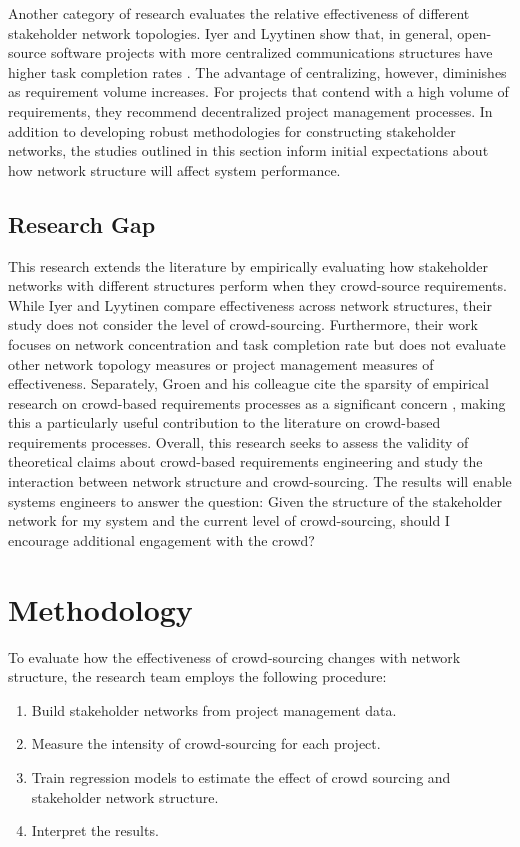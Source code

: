 Another category of research evaluates the relative effectiveness of different stakeholder network topologies. Iyer and Lyytinen show that, in general, open-source software projects with more centralized communications structures have higher task completion rates \cite{iyer}. The advantage of centralizing, however, diminishes as requirement volume increases. For projects that contend with a high volume of requirements, they recommend decentralized project management processes. In addition to developing robust methodologies for constructing stakeholder networks, the studies outlined in this section inform initial expectations about how network structure will affect system performance.

\subsection{Research Gap}

This research extends the literature by empirically evaluating how stakeholder networks with different structures perform when they crowd-source requirements. While Iyer and Lyytinen compare effectiveness across network structures, their study does not consider the level of crowd-sourcing. Furthermore, their work focuses on network concentration and task completion rate but does not evaluate other network topology measures or project management measures of effectiveness. Separately, Groen and his colleague cite the sparsity of empirical research on crowd-based requirements processes as a significant concern \cite{groen}, making this a particularly useful contribution to the literature on crowd-based requirements processes. Overall, this research seeks to assess the validity of theoretical claims about crowd-based requirements engineering and study the interaction between network structure and crowd-sourcing. The results will enable systems engineers to answer the question: Given the structure of the stakeholder network for my system and the current level of crowd-sourcing, should I encourage additional engagement with the crowd?

\section{Methodology}

To evaluate how the effectiveness of crowd-sourcing changes with network structure, the research team employs the following procedure:

\begin{enumerate}
    \item Build stakeholder networks from project management data.
    \item Measure the intensity of crowd-sourcing for each project.
    \item Train regression models to estimate the effect of crowd sourcing and stakeholder network structure.
    \item Interpret the results.
\end{enumerate}

